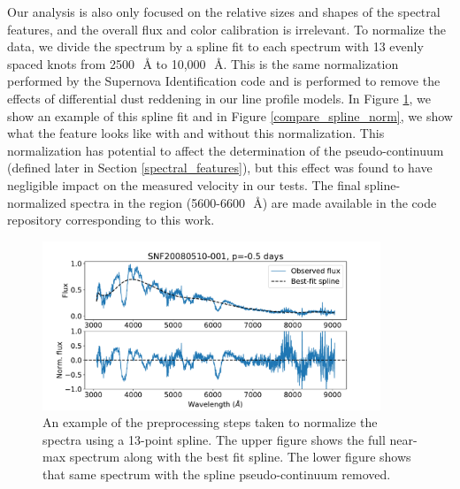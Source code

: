 Our analysis is also only focused on the relative sizes and shapes of the spectral features, and the overall flux and color calibration is irrelevant. To normalize the data, we divide the spectrum by a spline fit to each spectrum with 13 evenly spaced knots from 2500~\,\AA{} to 10,000~\,\AA{}. This is the same normalization performed by the Supernova Identification code \citep[SNID,][]{blondin_determining_2007} and is performed to remove the effects of differential dust reddening in our line profile models. In Figure \ref{spline_norm_ex}, we show an example of this spline fit and in Figure \ref{compare_spline_norm}, we show what the \siliconii{} feature looks like with and without this normalization. This normalization has potential to affect the determination of the pseudo-continuum (defined later in Section \ref{spectral_features}), but this effect was found to have negligible impact on the measured velocity in our tests. The final spline-normalized spectra in the \siliconii{} region (5600-6600~\,\AA{}) are made available in the code repository corresponding to this work.

\begin{figure}[htbp]
    \centering
    \includegraphics[width=0.9\textwidth]{figures/si_feat_pca/spline_norm_ex.pdf}
    \caption{An example of the preprocessing steps taken to normalize the spectra using a 13-point spline. The upper figure shows the full near-max spectrum along with the best fit spline. The lower figure shows that same spectrum with the spline pseudo-continuum removed.}
    \label{spline_norm_ex}
\end{figure}

